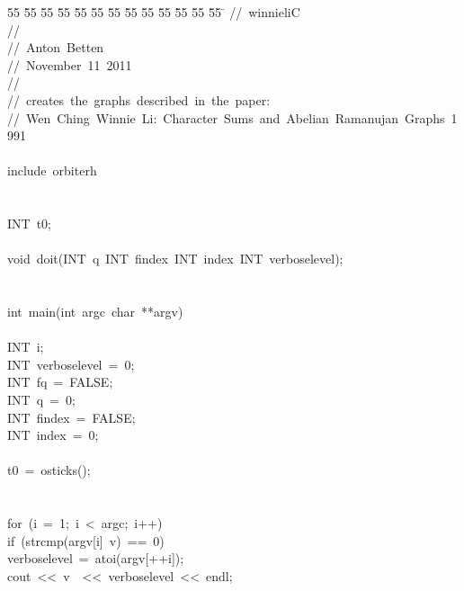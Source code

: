 %
%
\begin{tabbing}
55 \= 55 \= 55 \= 55 \= 55 \= 55 \= 55 \= 55 \= 55 \= 55 \= 55 \= 55 \= 55 \= \kill
//\ winnieliC\\[0pt]
//\\[0pt]
//\ Anton\ Betten\\[0pt]
//\ November\ 11\ 2011\\[0pt]
//\\[0pt]
//\ creates\ the\ graphs\ described\ in\ the\ paper:\\[0pt]
//\ Wen\ Ching\ Winnie\ Li:\ Character\ Sums\ and\ Abelian\ Ramanujan\ Graphs\ 1991\\[0pt]
\\[0pt]
include\ orbiterh\\[0pt]
\\[0pt]
\\[0pt]
INT\ t0;\\[0pt]
\\[0pt]
void\ doit(INT\ q\ INT\ findex\ INT\ index\ INT\ verboselevel);\\[0pt]
\\[0pt]
\\[0pt]
int\ main(int\ argc\ char\ **argv)\\[0pt]
\\[0pt]
\>INT\ i;\\[0pt]
\>INT\ verboselevel\ =\ 0;\\[0pt]
\>INT\ fq\ =\ FALSE;\\[0pt]
\>INT\ q\ =\ 0;\\[0pt]
\>INT\ findex\ =\ FALSE;\\[0pt]
\>INT\ index\ =\ 0;\\[0pt]
\>\\[0pt]
\>t0\ =\ osticks();\\[0pt]
\\[0pt]
\>\\[0pt]
\>for\ (i\ =\ 1;\ i\ <\ argc;\ i++)\ \\[0pt]
\>\>if\ (strcmp(argv[i]\ v)\ ==\ 0)\ \\[0pt]
\>\>\>verboselevel\ =\ atoi(argv[++i]);\\[0pt]
\>\>\>cout\ <<\ v\ \ <<\ verboselevel\ <<\ endl;\\[0pt]

\end{tabbing}
